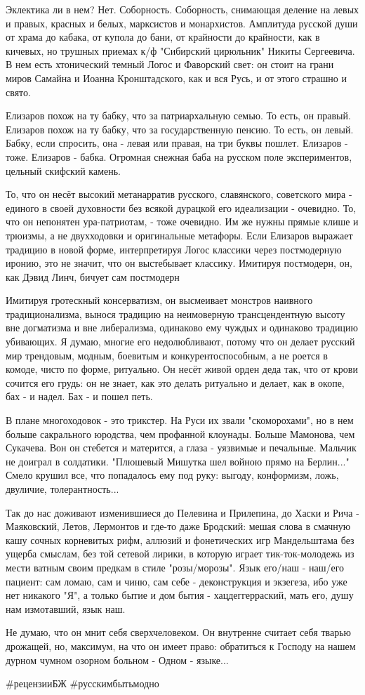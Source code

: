 Эклектика ли в нем? Нет. Соборность. Соборность, снимающая деление на левых и
правых, красных и белых, марксистов и монархистов. Амплитуда русской души от
храма до кабака, от купола до бани, от крайности до крайности, как в кичевых,
но трушных приемах к/ф "Сибирский цирюльник" Никиты Сергеевича. В нем есть
хтонический темный Логос и Фаворский свет: он стоит на грани миров Самайна и
Иоанна Кронштадского, как и вся Русь, и от этого страшно и свято.

Елизаров похож на ту бабку, что за патриархальную семью. То есть, он правый.
Елизаров похож на ту бабку, что за государственную пенсию. То есть, он левый.
Бабку, если спросить, она - левая или правая, на три буквы пошлет. Елизаров -
тоже. Елизаров - бабка. Огромная снежная баба на русском поле экспериментов,
цельный скифский камень.

То, что он несёт высокий метанарратив русского, славянского, советского мира -
единого в своей духовности без всякой дурацкой его идеализации - очевидно. То,
что он непонятен ура-патриотам, - тоже очевидно. Им же нужны прямые клише и
трюизмы, а не двухходовки и оригинальные метафоры. Если Елизаров выражает
традицию в новой форме, интерпретируя Логос классики через постмодерную иронию,
это не значит, что он выстебывает классику. Имитируя постмодерн, он, как Дэвид
Линч, бичует сам постмодерн

Имитируя гротескный консерватизм, он высмеивает монстров наивного
традиционализма, вынося традицию на неимоверную трансцендентную высоту вне
догматизма и вне либерализма, одинаково ему чуждых и одинаково традицию
убивающих. Я думаю, многие его недолюбливают, потому что он делает русский мир
трендовым, модным, боевитым и конкурентоспособным, а не роется в комоде, чисто
по форме, ритуально. Он несёт живой орден деда так, что от крови сочится его
грудь: он не знает, как это делать ритуально и делает, как в окопе, бах - и
надел. Бах - и пошел петь.

В плане многоходовок - это трикстер. На Руси их звали "скоморохами", но в нем
больше сакрального юродства, чем профанной клоунады. Больше Мамонова, чем
Сукачева. Вон он стебется и матерится, а глаза - уязвимые и печальные. Мальчик
не доиграл в солдатики. "Плюшевый Мишутка шел войною прямо на Берлин..." Смело
крушил все, что попадалось ему под руку: выгоду, конформизм, ложь, двуличие,
толерантность...

Так до нас доживают изменившиеся до Пелевина и Прилепина, до Хаски и Рича -
Маяковский, Летов, Лермонтов и где-то даже Бродский: мешая слова в смачную кашу
сочных корневитых рифм, аллюзий и фонетических игр Мандельштама без ущерба
смыслам, без той сетевой лирики, в которую играет тик-ток-молодежь из мести
ватным своим предкам в стиле "розы/морозы".  Язык его/наш - наш/его пациент:
сам ломаю, сам и чиню, сам себе - деконструкция и экзегеза, ибо уже нет
никакого "Я", а только бытие и дом бытия - хацдеггерраский, мать его, душу нам
измотавший, язык наш.

Не думаю, что он мнит себя сверхчеловеком. Он внутренне считает себя тварью
дрожащей, но, максимум, на что он имеет право: обратиться к Господу на нашем
дурном чумном озорном больном - Одном - языке...

\#рецензииБЖ \#русскимбытьмодно

